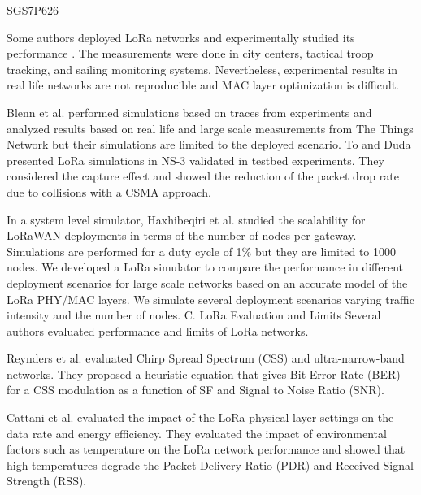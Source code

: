 \cite{ochoa_large_2018} SGS7P626

Some authors deployed LoRa networks and experimentally studied its performance  \cite{aref_free_2014}
\cite{petajajarvi_coverage_2015-1}
\cite{wixted_evaluation_2016}
\cite{san-um_long-range_2017}
\cite{li_application_2017}.
The measurements were done in city centers,
	tactical troop tracking,
	and sailing monitoring systems.
Nevertheless,
	experimental results in real life networks are not reproducible and MAC layer optimization is difficult.

Blenn et al.
\cite{blenn_lorawan_2017} performed simulations based on traces from experiments and analyzed results based on real life and large scale measurements from The Things Network but their simulations are limited to the deployed scenario.
To and Duda \cite{to_simulation_2018} presented LoRa simulations in NS-3 validated in testbed experiments.
They considered the capture effect and showed the reduction of the packet drop rate due to collisions with a CSMA approach.

In a system level simulator,
	Haxhibeqiri et al.
\cite{jetmir_haxhibeqiri_lora_2017} studied the scalability for LoRaWAN deployments in terms of the number of nodes per gateway.
Simulations are performed for a duty cycle of 1\% but they are limited to 1000 nodes.
We developed a LoRa simulator to compare the performance in different deployment scenarios for large scale networks based on an accurate model of the LoRa PHY/MAC layers.
We simulate several deployment scenarios varying traffic intensity and the number of nodes.
C.
LoRa Evaluation and Limits Several authors evaluated performance and limits of LoRa networks.

Reynders et al.
\cite{reynders_range_2016} evaluated Chirp Spread Spectrum (CSS) and ultra-narrow-band networks.
They proposed a heuristic equation that gives Bit Error Rate (BER) for a CSS modulation as a function of SF and Signal to Noise Ratio (SNR).

Cattani et al.
\cite{marco_cattani_experimental_2017} evaluated the impact of the LoRa physical layer settings on the data rate and energy efficiency.
They evaluated the impact of environmental factors such as temperature on the LoRa network performance and showed that high temperatures degrade the Packet Delivery Ratio (PDR) and Received Signal Strength (RSS).


